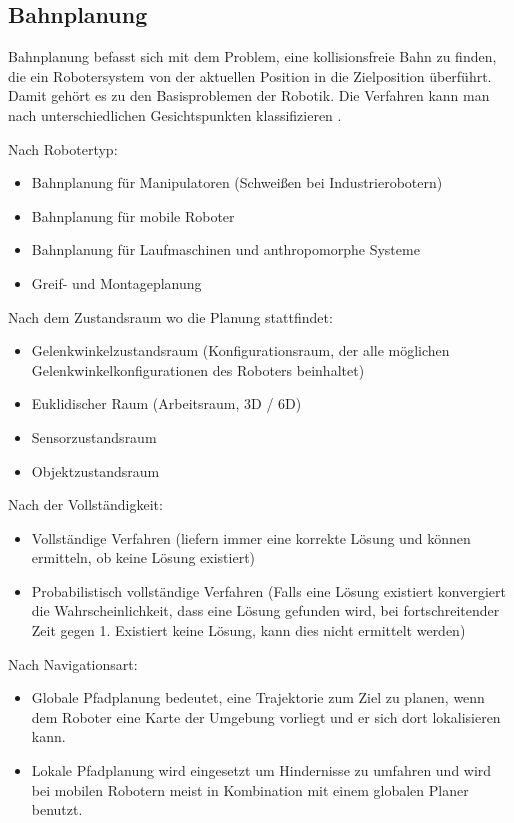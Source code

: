 \subsection{Bahnplanung}
\label{bahnplanung_grundlagen_sec}
\authorsection{\editoroier}

Bahnplanung befasst sich mit dem Problem, eine kollisionsfreie Bahn zu finden, die ein Robotersystem von der aktuellen Position in die Zielposition überführt.
Damit gehört es zu den Basisproblemen der Robotik.
Die Verfahren kann man nach unterschiedlichen Gesichtspunkten klassifizieren \cite{rob1}.

Nach Robotertyp:
\begin{itemize}
	\item Bahnplanung für Manipulatoren (\zB Schweißen bei Industrierobotern)
	\item Bahnplanung für mobile Roboter
	\item Bahnplanung für Laufmaschinen und anthropomorphe Systeme
	\item Greif- und Montageplanung
\end{itemize}

Nach dem Zustandsraum wo die Planung stattfindet:
\begin{itemize}
	\item Gelenkwinkelzustandsraum (Konfigurationsraum, der alle möglichen
Gelenkwinkelkonfigurationen des Roboters beinhaltet)
	\item Euklidischer Raum (Arbeitsraum, 3D / 6D)
	\item Sensorzustandsraum
	\item Objektzustandsraum
\end{itemize}

Nach der Vollständigkeit:
\begin{itemize}
	\item Vollständige Verfahren (liefern immer eine korrekte Lösung und können ermitteln, ob keine Lösung existiert)
	\item Probabilistisch vollständige Verfahren (Falls eine Lösung existiert konvergiert die Wahrscheinlichkeit, dass eine Lösung gefunden wird, bei fortschreitender Zeit gegen 1. Existiert keine Lösung, kann dies nicht ermittelt werden)
\end{itemize}

Nach Navigationsart:
\begin{itemize}
	\item Globale Pfadplanung bedeutet, eine Trajektorie zum Ziel zu planen, wenn dem Roboter eine Karte der Umgebung vorliegt und er sich dort lokalisieren kann.
	\item Lokale Pfadplanung wird eingesetzt um Hindernisse zu umfahren und wird bei mobilen Robotern meist in Kombination mit einem globalen Planer benutzt. 
\end{itemize}

